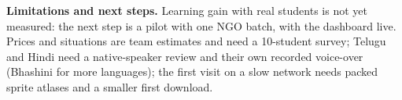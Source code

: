 \documentclass[10pt,a4paper]{article}
\begin{document}
\textbf{Limitations and next steps.} Learning gain with real students is not yet measured: the next step is a pilot with one NGO batch, with the dashboard live. Prices and situations are team estimates and need a 10-student survey; Telugu and Hindi need a native-speaker review and their own recorded voice-over (Bhashini for more languages); the first visit on a slow network needs packed sprite atlases and a smaller first download.
\end{document}
